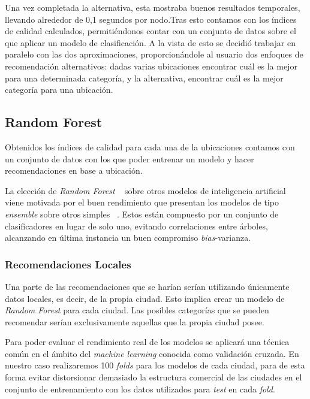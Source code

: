 Una vez completada la alternativa, esta mostraba buenos resultados temporales, llevando alrededor de 0,1 segundos por nodo.Tras esto contamos con los índices de calidad calculados,
permitiéndonos contar con un conjunto de datos sobre el que aplicar un modelo de clasificación. A la vista de esto se decidió trabajar en paralelo con las dos aproximaciones, proporcionándole al usuario dos enfoques de recomendación alternativos: dadas varias ubicaciones encontrar cuál es la mejor para una determinada categoría, y la alternativa, encontrar cuál es la mejor categoría para una ubicación. 

\subsection{Random Forest}


Obtenidos los índices de calidad para cada una de la ubicaciones contamos con un conjunto de datos con los que poder entrenar un modelo y hacer recomendaciones en base a ubicación.

La elección de \textit{Random Forest} ~\cite{RF} sobre otros modelos de inteligencia artificial viene motivada por el buen rendimiento que presentan los modelos de tipo \textit{ensemble} sobre otros simples ~\cite{Ahedo2021, HundredClass}. Estos están compuesto por un conjunto de clasificadores en lugar de solo uno, evitando correlaciones entre árboles, alcanzando en última instancia un buen compromiso \textit{bias}-varianza.

\subsubsection{Recomendaciones Locales}

Una parte de las recomendaciones que se harían serían utilizando únicamente datos locales, es decir, de la propia ciudad. Esto implica crear un modelo de \textit{Random Forest} para cada ciudad. Las posibles categorías que se pueden recomendar serían exclusivamente aquellas que la propia ciudad posee.

Para poder evaluar el rendimiento real de los modelos se aplicará una técnica común en el ámbito del \textit{machine learning} conocida como validación cruzada. En nuestro caso realizaremos 100 \textit{folds} para los modelos de cada ciudad, para de esta forma evitar distorsionar demasiado la estructura comercial de las ciudades en el conjunto de entrenamiento con los datos utilizados para \textit{test} en cada \textit{fold}.

